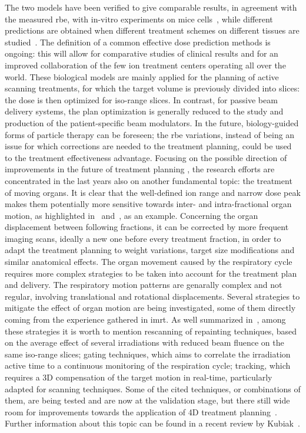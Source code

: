 The two models have been verified to give comparable results, in agreement with the measured \gls{rbe}, with in-vitro experiments on mice cells~\parencite{Uzawa2009}, while different predictions are obtained when different treatment schemes on different tissues are studied~\parencite{Fossati2012, Steinstrater2012}. The definition of a common effective dose prediction methods is ongoing: this will allow for comparative studies of clinical results and for an improved collaboration of the few ion treatment centers operating all over the world.
These biological models are mainly applied for the planning of active scanning treatments, for which the target volume is previously divided into slices: the dose is then optimized for iso-range slices. In contrast, for passive beam delivery systems, the plan optimization is generally reduced to the study and production of the patient-specific beam modulators. 
In the future, biology-guided forms of particle therapy can be foreseen; the \gls{rbe} variations, instead of being an issue for which corrections are needed to the treatment planning, could be used to the treatment effectiveness advantage.  
Focusing on the possible direction of improvements in the future of treatment planning , the research efforts are concentrated in the last years also on another fundamental topic: the treatment of moving organs. It is clear that the well-defined ion range and narrow dose peak makes them potentially more sensitive towards inter- and intra-fractional organ motion, as highlighted in~\cite{Phillips1992, Bert2008, Engelsman2013} and~\cite{Thornqvist2013}, as an example. Concerning the organ displacement between following fractions, it can be corrected by more frequent imaging scans, ideally a new one before every treatment fraction, in order to adapt the treatment planning to weight variations, target size modifications and similar anatomical effects. The organ movement caused by the respiratory cycle requires more complex strategies to be taken into account for the treatment plan and delivery. The respiratory motion patterns are genarally complex and not regular, involving translational and rotational displacements. Several strategies to mitigate the effect of organ motion are being investigated, some of them directly coming from the experience gathered in \gls{imrt}. As well summarized in~\cite{Schardt2010}, among these strategies it is worth to mention rescanning of repainting techniques, based on the average effect of several irradiations with reduced beam fluence on the same iso-range slices; gating techniques, which aims to correlate the irradiation active time to a continuous monitoring of the respiration cycle; tracking, which requires a 3D compensation of the target motion in real-time, particularly adapted for scanning techniques. Some of the cited techniques, or combinations of them, are being tested and are now at the validation stage, but there still wide room for improvements towards the application of 4D treatment planning~\parencite{Graeff2013, Bert2017}. Further information about this topic  can be found in a recent review by Kubiak~\parencite{Kubiak2016}.    

